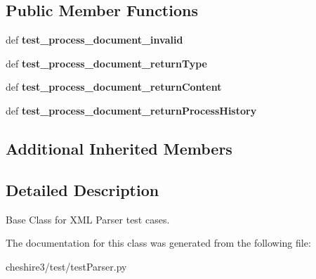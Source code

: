 \subsection*{Public Member Functions}
\begin{DoxyCompactItemize}
\item 
\hypertarget{classcheshire3_1_1test_1_1test_parser_1_1_xml_parser_test_case_a88dc48f8f642aa55caf2253da90aa061}{def {\bfseries test\-\_\-process\-\_\-document\-\_\-invalid}}\label{classcheshire3_1_1test_1_1test_parser_1_1_xml_parser_test_case_a88dc48f8f642aa55caf2253da90aa061}

\item 
\hypertarget{classcheshire3_1_1test_1_1test_parser_1_1_xml_parser_test_case_a425e1c3a0d39af23600eb412543019d5}{def {\bfseries test\-\_\-process\-\_\-document\-\_\-return\-Type}}\label{classcheshire3_1_1test_1_1test_parser_1_1_xml_parser_test_case_a425e1c3a0d39af23600eb412543019d5}

\item 
\hypertarget{classcheshire3_1_1test_1_1test_parser_1_1_xml_parser_test_case_ae358efb4444c16cb093fe82a840eb766}{def {\bfseries test\-\_\-process\-\_\-document\-\_\-return\-Content}}\label{classcheshire3_1_1test_1_1test_parser_1_1_xml_parser_test_case_ae358efb4444c16cb093fe82a840eb766}

\item 
\hypertarget{classcheshire3_1_1test_1_1test_parser_1_1_xml_parser_test_case_a68b71e7adfd9142fc031edc9960aa57a}{def {\bfseries test\-\_\-process\-\_\-document\-\_\-return\-Process\-History}}\label{classcheshire3_1_1test_1_1test_parser_1_1_xml_parser_test_case_a68b71e7adfd9142fc031edc9960aa57a}

\end{DoxyCompactItemize}
\subsection*{Additional Inherited Members}


\subsection{Detailed Description}
\begin{DoxyVerb}Base Class for XML Parser test cases.\end{DoxyVerb}
 

The documentation for this class was generated from the following file\-:\begin{DoxyCompactItemize}
\item 
cheshire3/test/test\-Parser.\-py\end{DoxyCompactItemize}
